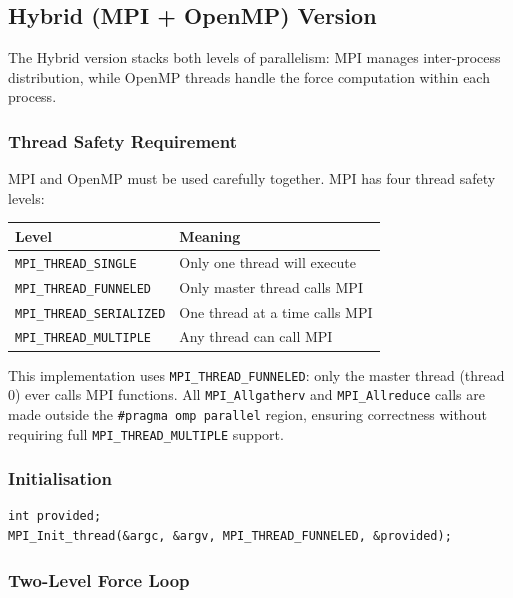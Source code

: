 ﻿\documentclass[12pt,a4paper]{article}
\begin{document}
\subsection{Hybrid (MPI + OpenMP) Version}

The Hybrid version stacks both levels of parallelism: MPI manages
inter-process distribution, while OpenMP threads handle the force computation
within each process.

\subsubsection*{Thread Safety Requirement}

MPI and OpenMP must be used carefully together. MPI has four thread safety
levels:

\begin{center}
\begin{tabular}{ll}
    \toprule
    \textbf{Level} & \textbf{Meaning} \\
    \midrule
    \texttt{MPI\_THREAD\_SINGLE}    & Only one thread will execute \\
    \texttt{MPI\_THREAD\_FUNNELED}  & Only master thread calls MPI \\
    \texttt{MPI\_THREAD\_SERIALIZED}& One thread at a time calls MPI \\
    \texttt{MPI\_THREAD\_MULTIPLE}  & Any thread can call MPI \\
    \bottomrule
\end{tabular}
\end{center}

This implementation uses \texttt{MPI\_THREAD\_FUNNELED}: only the master
thread (thread 0) ever calls MPI functions. All \texttt{MPI\_Allgatherv}
and \texttt{MPI\_Allreduce} calls are made outside the
\texttt{\#pragma omp parallel} region, ensuring correctness without
requiring full \texttt{MPI\_THREAD\_MULTIPLE} support.

\subsubsection*{Initialisation}

\begin{lstlisting}
int provided;
MPI_Init_thread(&argc, &argv, MPI_THREAD_FUNNELED, &provided);
\end{lstlisting}

\subsubsection*{Two-Level Force Loop}
\end{document}
